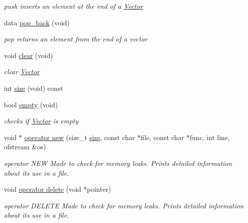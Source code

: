 \begin{DoxyCompactItemize}
\begin{DoxyCompactList}\small\item\em push  inserts an element at the end of a \hyperlink{classVector}{Vector} \end{DoxyCompactList}\item 
data \hyperlink{classVector_af58fb997ed40663eb1e9f17b96cbc846}{pop\+\_\+back} (void)
\begin{DoxyCompactList}\small\item\em pop  returns an element from the end of a vector \end{DoxyCompactList}\item 
\mbox{\label{classVector_a9a4aa65c1485541c654f3917cc4d37e9}} 
void \hyperlink{classVector_a9a4aa65c1485541c654f3917cc4d37e9}{clear} (void)
\begin{DoxyCompactList}\small\item\em clear \hyperlink{classVector}{Vector} \end{DoxyCompactList}\item 
int \hyperlink{classVector_a81b1d973485244101caf8e901b4a03d9}{size} (void) const
\item 
bool \hyperlink{classVector_ae203aae4d9a6dbabd4883c9e6fd84f79}{empty} (void)
\begin{DoxyCompactList}\small\item\em checks if \hyperlink{classVector}{Vector} is empty \end{DoxyCompactList}\item 
void $\ast$ \hyperlink{classVector_a443e08072f54a08e6c4eaaab66d25a3d}{operator new} (size\+\_\+t \hyperlink{classVector_a81b1d973485244101caf8e901b4a03d9}{size}, const char $\ast$file, const char $\ast$func, int line, ofstream \&os)
\begin{DoxyCompactList}\small\item\em operator N\+EW  Made to check for memory leaks. Prints detailed information about its use in a file. \end{DoxyCompactList}\item 
void \hyperlink{classVector_a7994afefee442d3980f1b1125152fe50}{operator delete} (void $\ast$pointer)
\begin{DoxyCompactList}\small\item\em operator D\+E\+L\+E\+TE  Made to check for memory leaks. Prints detailed information about its use in a file. \end{DoxyCompactList}\end{DoxyCompactItemize}
